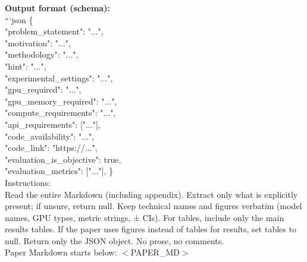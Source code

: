 \documentclass[11pt]{article}
\theoremstyle{plain}
\theoremstyle{definition}
\theoremstyle{remark}
\begin{document}
\begin{tcolorbox}
\textbf{Output format (schema):}\\
```json
\{\\
  "problem\_statement": "...",\\
  "motivation": "...",\\
  "methodology": "...",\\
  "hint": "...",\\
  "experimental\_settings": "...",\\
  "gpu\_required": "...",\\
  "gpu\_memory\_required": "...",\\
  "compute\_requirements": "...",\\
  "api\_requirements": ["..."],\\
  "code\_availability": "...",\\
  "code\_link": "https://...",\\
  "evaluation\_is\_objective": true,\\
  "evaluation\_metrics": ["..."],
\}\\

Instructions:\\
Read the entire Markdown (including appendix).
Extract only what is explicitly present; if unsure, return null.
Keep technical names and figures verbatim (model names, GPU types, metric strings, ± CIs).
For tables, include only the main results tables. If the paper uses figures instead of tables for results, set tables to null.
Return only the JSON object. No prose, no comments.\\
Paper Markdown starts below:  $<$PAPER\_MD$>$
\end{tcolorbox} \label{box:card-extraction}
\end{document}
